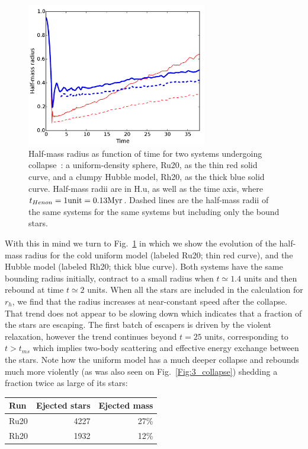 \begin{figure}
\begin{center}
\includegraphics[width=0.7\textwidth]{Figures/3_Rhm_global}
\caption[Half-mass radius as function of time for both HL fragmented and uniform model]{Half-mass radius as function of time for two systems undergoing collapse~: a uniform-density sphere, Ru20, as the thin red solid curve, and a clumpy Hubble model, Rh20, as the thick blue solid curve. Half-mass radii are in H.u, as well as the time axis, where $t_{Henon} = 1 {\rm unit} =  0.13 {\textrm{Myr}}$. Dashed lines are the half-mass radii of the same systems for the same systems but including only the bound stars.}
\label{Fig:3_Rhm_global}
\end{center}
\end{figure}




With this in mind  we turn to Fig.~\ref{Fig:3_Rhm_global} in which we show the evolution of the half-mass radius for the cold uniform model (labeled Ru20; thin red curve), and the Hubble model (labeled Rh20; thick blue curve). Both systems have the same bounding radius initially, contract to a small radius when $t \simeq 1.4 $ units and then rebound at time $t \simeq 2 $ units. When all the stars are included in the calculation for $r_h$, we find that the radius increases at near-constant speed after the collapse. That trend does not appear to be slowing down which indicates that a fraction of the stars are escaping. The first batch of escapers is driven by the violent relaxation, however the trend continues beyond $ t = 25$ units, corresponding to $t > t_{ms}$ which implies two-body scattering and effective energy exchange between the stars. Note how the uniform model has a much deeper collapse and rebounds much more violently (as was also seen on Fig.~\ref{Fig:3_collapse}) shedding a fraction twice as large of its stars:
%
\begin{center}
\begin{tabular}{lrr}
Run & Ejected stars & Ejected mass  \\
\hline
Ru20  &  4227 & 27\% \\
Rh20  &  1932 & 12\% \\
\end{tabular}
\end{center}




